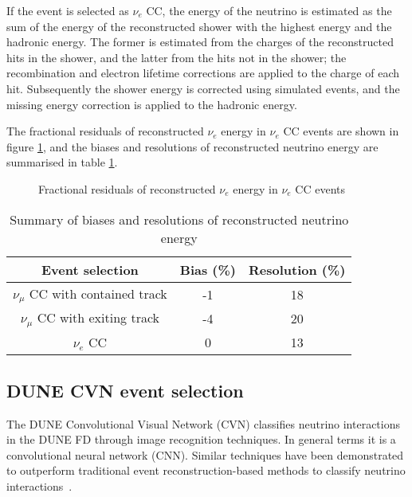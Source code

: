If the event is selected as $\nu_{e}$ CC, the energy of the 
neutrino is estimated as the sum of the energy of the reconstructed shower with the highest energy and the hadronic energy. The former is estimated from the charges of the reconstructed 
hits in the shower, and the latter from the hits not in the shower; the recombination and electron lifetime corrections are applied to the charge of each hit. Subsequently the shower 
energy is corrected using simulated events, and the missing energy correction is applied to the hadronic energy.

The fractional residuals of reconstructed $\nu_{e}$ energy in $\nu_{e}$ CC events are shown in figure \ref{fig:enresnue}, and the biases and resolutions of reconstructed neutrino energy 
are summarised in table \ref{tab:ressummary}.

\begin{figure}[h]
    \centering
        \caption{Fractional residuals of reconstructed $\nu_{e}$ energy in $\nu_{e}$ CC events}
        \label{fig:enresnue}
\end{figure}

\begin{table}[h]
\begin{center}
\begin{tabular}{|c|c|c|}
\hline  
 Event selection  &   Bias (\%) & Resolution (\%) \\ \hline
\hline
 $\nu_{\mu}$ CC with contained track  &   -1  &  18   \\ \hline
 $\nu_{\mu}$ CC with exiting track  &  -4   &  20 \\ \hline
 $\nu_{e}$ CC    &  0 & 13    \\ \hline
\end{tabular}
\caption{Summary of biases and resolutions of reconstructed neutrino energy}
\label{tab:ressummary}
\end{center}
\end{table}


\subsection{DUNE CVN event selection}
The DUNE Convolutional Visual Network (CVN) classifies neutrino interactions in the DUNE FD through image recognition techniques. In general terms it is a convolutional neural network (CNN). Similar techniques have been demonstrated to outperform traditional event reconstruction-based methods to classify neutrino interactions~\cite{novacvn}.

